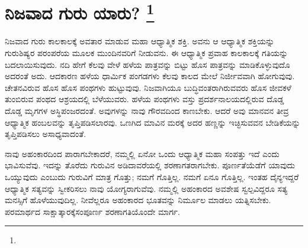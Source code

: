 
\chapter[ನಿಜವಾದ ಗುರು ಯಾರು? ]{ನಿಜವಾದ ಗುರು ಯಾರು? \protect\footnote{}}

ನಿಜವಾದ ಗುರು ಕಾಲಕಾಲಕ್ಕೆ ಅವತಾರ ಮಾಡುವ ಮಹಾ ಆಧ್ಯಾತ್ಮಿಕ ಶಕ್ತಿ. ಅವನು ಆ ಆಧ್ಯಾತ್ಮಿಕ ಶಕ್ತಿಯನ್ನು ಗುರುಶಿಷ್ಯರ ಪರಂಪರೆಯ ಮೂಲಕ ಮುಂದಿನವರಿಗೆ ನೀಡುವನು. ಈ ಆಧ್ಯಾತ್ಮಿಕ ಪ್ರವಾಹ ಕಾಲಕಾಲಕ್ಕೆ ಗತಿಯನ್ನು ಬದಲಾಯಿಸುವುದು. ನದಿ ಹೇಗೆ ಕೆಲವು ವೇಳೆ ಹಳೆಯ ಪಾತ್ರವನ್ನು ಬಿಟ್ಟು ಹೊಸ ಪಾತ್ರವನ್ನು ಮಾಡಿಕೊಳ್ಳುವುದೊ ಅದರಂತೆ ಅದು. ಆದಕಾರಣ ಹಳೆಯ ಧಾರ್ಮಿಕ ಪಂಗಡಗಳು ಕೆಲವು ಕಾಲದ ಮೇಲೆ ನಿರ್ಜೀವವಾಗಿ ಹೋಗುವುವು. ಚೇತನವಿರುವ ಹೊಸ ಹೊಸ ಪಂಥಗಳು ಹುಟ್ಟುವುವು. ನಿಜವಾಗಿಯೂ ಬುದ್ಧಿವಂತರಾಗಿರುವವರು ಹೊಸ ಜೀವಕಳೆ ತುಂಬಿರುವ ಪಂಥದ ಆಶ್ರಯದಲ್ಲಿ ಬೆಳೆಯುವರು. ಹಳೆಯ ಪಂಥಗಳು ವಸ್ತು ಪ್ರದರ್ಶನಾಲಯದಲ್ಲಿರುವ ದೊಡ್ಡ ದೊಡ್ಡ ಮೃಗಗಳ ಅಸ್ಥಿಪಂಜರದಂತೆ. ಅವುಗಳನ್ನು ನಾವು ಗೌರವದಿಂದ ಕಾಣಬೇಕು. ಆದರೆ ಅವು ಮಾನವನ ತೀವ್ರ ಆಧ್ಯಾತ್ಮಿಕ ಹಂಬಲವನ್ನು ತೃಪ್ತಿಪಡಿಸಲಾರವು. ಒಣಗಿದ ಮಾವಿನ ಮರಕ್ಕೆ ಅದರ ಹಣ್ಣನ್ನು ಇಚ್ಛಿಸುವವನ ಬೇಡಿಕೆಯನ್ನು ತೃಪ್ತಿಪಡಿಸಲು ಅಸಾಧ್ಯವಾದಂತೆ.

ನಾವು ಅಹಂಕಾರದಿಂದ ಪಾರಾಗಬೇಕಾದರೆ, ನಮ್ಮಲ್ಲಿ ಏನೋ ಒಂದು ಆಧ್ಯಾತ್ಮಿಕ ಮಹಾ ಸಂಪತ್ತು ಇದೆ ಎಂದು ಭಾವಿಸುವೆವು. ಇದನ್ನು ತೊರೆದು ಗುರುವಿನ ಅಡಿದಾವರೆಯಲ್ಲಿ ಶರಣಾಗತರಾಗಬೇಕು. ಪೂರ್ಣತೆಯೆಡೆಗೆ ಯಾವುದು ಒಯ್ಯುವುದು ಎಂಬುದು ಗುರುವಿಗೆ ಮಾತ್ರ ಗೊತ್ತು; ನಮಗೆ ಗೊತ್ತಿಲ್ಲ. ನಮಗೆ ಏನೂ ಗೊತ್ತಿಲ್ಲ. ಇಂತಹ ದೈನ್ಯ\break ಇದ್ದರೆ ಆಧ್ಯಾತ್ಮಿಕ ಸತ್ಯವನ್ನು ಸ್ವೀಕರಿಸಲು ನಾವು ಯೋಗ್ಯರಾಗುವೆವು. ನಮ್ಮಲ್ಲಿ ಅಹಂಕಾರದ ಅವಶೇಷ ಸ್ವಲ್ಪವಿದ್ದರೂ ಸತ್ಯ ಮನಸ್ಸಿಗೆ ಹೊಳೆಯುವುದಿಲ್ಲ. ನೀವೆಲ್ಲರೂ ಅಹಂಕಾರದ ಭೂತವನ್ನು ನಿರ್ಮೂಲ ಮಾಡಲು ಯತ್ನಿಸಬೇಕು. ಪರಮಾರ್ಥದ ಸಾಕ್ಷಾತ್ಕಾರಕ್ಕೆ\break ಸಂಪೂರ್ಣ ಶರಣಾಗತಿಯೊಂದೇ ಮಾರ್ಗ.

